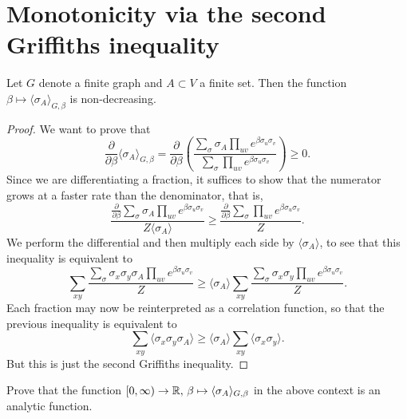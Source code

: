 \section{Monotonicity via the second Griffiths inequality}

\begin{theorem}
    Let $G$ denote a finite graph and $A\subset V$ a finite set.
    Then the function $\beta\mapsto\langle\sigma_A\rangle_{G,\beta}$
    is non-decreasing.
\end{theorem}

\begin{proof}
    We want to prove that
    \[
        \frac{\partial}{\partial\beta}
        \langle\sigma_A\rangle_{G,\beta}
        =
        \frac{\partial}{\partial\beta}
        \left(
            \frac{
                \sum_\sigma\sigma_A\prod_{uv}e^{\beta\sigma_u\sigma_v}
            }{
                \sum_\sigma\prod_{uv}e^{\beta\sigma_u\sigma_v}
            }
        \right)
        \geq 0.
    \]
    Since we are differentiating a fraction,
    it suffices to show that the numerator grows at a faster rate
    than the denominator,
    that is,
    \[
        \frac{\frac{\partial}{\partial\beta}
            \sum_\sigma\sigma_A\prod_{uv}e^{\beta\sigma_u\sigma_v}
        }{
            Z\langle\sigma_A\rangle
        }
        \geq
        \frac{\frac{\partial}{\partial\beta}
            \sum_\sigma\prod_{uv}e^{\beta\sigma_u\sigma_v}
        }{
            Z
        }.
    \]
    We perform the differential and then multiply each side by $\langle\sigma_A\rangle$,
    to see that this inequality is equivalent to
    \[
        \sum_{xy}
        \frac{\sum_\sigma
            \sigma_x\sigma_y\sigma_A\prod_{uv}e^{\beta\sigma_u\sigma_v}
        }{Z}
        \geq
        \langle\sigma_A\rangle
        \sum_{xy}
        \frac{
            \sum_\sigma
            \sigma_x\sigma_y
            \prod_{uv}e^{\beta\sigma_u\sigma_v}
        }{Z}.
    \]
    Each fraction may now be reinterpreted as a correlation function,
    so that the previous inequality is equivalent to
    \[
        \sum_{xy}\langle\sigma_x\sigma_y\sigma_A\rangle
        \geq
        \langle\sigma_A\rangle
        \sum_{xy}\langle\sigma_x\sigma_y\rangle.
    \]
    But this is just the second Griffiths inequality.
\end{proof}

\begin{exercise}
    Prove that the function $[0,\infty)\to\mathbb R,\,\beta\mapsto\langle\sigma_A\rangle_{G,\beta}$
    in the above context is an analytic function.
\end{exercise}

